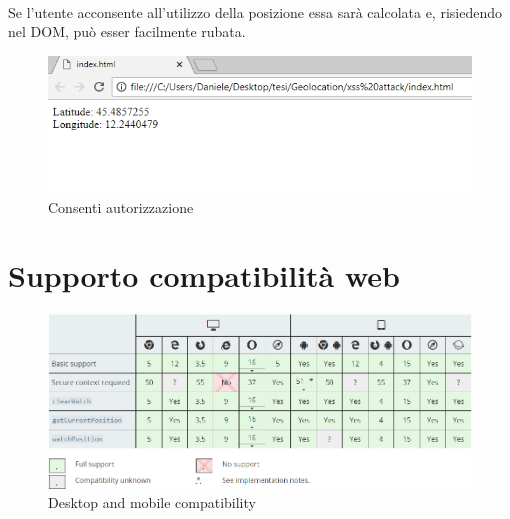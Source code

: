 \documentclass[11pt ,a4paper , twoside , openright ]{article}
\begin{document}
\\
Se l'utente acconsente all'utilizzo della posizione essa sarà calcolata e, risiedendo nel DOM, può esser facilmente rubata.
\begin{figure}[h]
	\centering
	\includegraphics[width=1\linewidth]{Consenti}
	\caption{Consenti autorizzazione}
	\label{fig: Consenti autorizzazione}
\end{figure}
\newpage
\section{Supporto compatibilità web}
\begin{figure}[h]
	\centering
	\includegraphics[width=1\linewidth]{compatibility}
	\caption{Desktop and mobile compatibility}
	\label{fig: Desktop and mobile compatibility}
\end{figure}
\newpage
\end{document}
